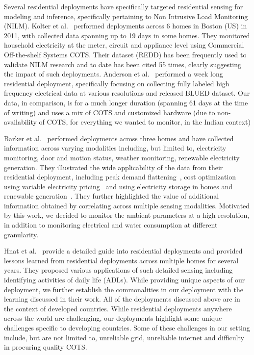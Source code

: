\documentclass[10pt]{sensys-proc}
\begin{document}
Several residential deployments have specifically targeted residential sensing for modeling and inference, specifically pertaining to Non Intrusive Load Monitoring (NILM). Kolter et al.~\cite{redd} performed deployments across 6 homes in Boston (US) in 2011, with collected data spanning up to 19 days in some homes. They monitored household electricity at the meter, circuit and appliance level using Commercial Off-the-shelf Systems COTS. Their dataset (REDD) has been frequently used to validate NILM research and to date has been cited 55 times, clearly suggesting the impact of such deployments. Anderson et al.~\cite{blued_cmu} performed a week long residential deployment, specifically focusing on collecting fully labeled high frequency electrical data at various resolutions and released BLUED dataset. Our data, in comparison, is for a much longer duration (spanning 61 days at the time of writing) and uses a mix of COTS and customized hardware (due to non-availability of COTS, for everything we wanted to monitor, in the Indian context)

Barker et al.~\cite{smart} performed deployments across three homes and have collected information across varying modalities including, but limited to, electricity monitoring, door and motion status, weather monitoring, renewable electricity generation. They illustrated the wide applicability of the data from their residential deployment, including peak demand flattening~\cite{smartcap}, cost optimization using variable electricity pricing~\cite{smartcharge} and using electricity storage in homes and renewable generation~\cite{cloudy}. They further highlighted the value of additional information obtained by correlating across multiple sensing modalities. Motivated by this work, we decided to monitor the ambient parameters at a high resolution, in addition to monitoring electrical and water consumption at different granularity.

Hnat et al.~\cite{hitchhiker_residential} provide a detailed guide into residential deployments and provided lessons learned from residential deployments across multiple homes for several years. They proposed various applications of such detailed sensing including identifying activities of daily life (ADLs). While providing unique aspects of our deployment, we further establish the commonalities in our deployment with the learning discussed in their work. %
All of the deployments discussed above are in the context of developed countries. While residential deployments anywhere across the world are challenging, our deployments highlight some unique challenges specific to developing countries. Some of these challenges in our setting include, but are not limited to, unreliable grid, unreliable internet and difficulty in procuring quality COTS.
\end{document}
